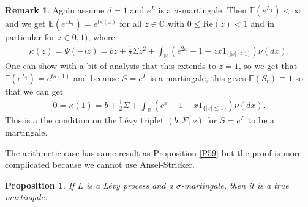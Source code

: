 \documentclass[12pt,a4paper, twoside]{article}
\newtheorem{prop}{Proposition}[section]
\theoremstyle{definition}
\newtheorem{rem}{Remark}[section]
\begin{document}
\newpage
\begin{rem} Again assume $d=1$ and $e^L$ is a $\sigma$-martingale. Then $\mathbb{E}(e^{L_1}) < \infty$ and we get $\mathbb{E}(e^{z L_t}) = e^{t \kappa (z)}$ for all $z \in \mathbb{C}$ with $0 \leq \text{Re}(z) < 1$ and in particular for $z \in 0,1)$, where 
\begin{align*}
\kappa(z)= \Psi(-iz) = bz + \frac{1}{2} \Sigma z^2 + \int_\mathbb{R} \left( e^{2x}-1-zx 1_{\{ |x| \leq 1\}} \right) \nu(dx). 
\end{align*}
One can show with a bit of analysis that this extends to $z=1$, so we get that $\mathbb{E}(e^{L_t})= e^{t \kappa(1)}$ and because $S=e^L$ is a martingale, this gives $\mathbb{E}(S_t) \equiv 1$ so that we can get 
\begin{align*}
0 = \kappa(1)= b + \frac{1}{2} \Sigma + \int_\mathbb{R} \left( e^x-1-x1_{\{|x| \leq 1\}} \right) \nu(dx).
\end{align*}
This is a the condition on the Lévy triplet $(b, \Sigma, \nu)$ for $S=e^L$ to be a martingale. 
\end{rem}
The arithmetic case has same result as Proposition \ref{P59} but the proof is more complicated because we cannot use Ansel-Stricker. 
\begin{prop} \label{P510} If $L$ is a Lévy process and a $\sigma$-martingale, then it is a true martingale. 
\end{prop}
\end{document}
